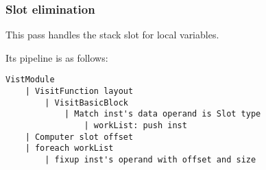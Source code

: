 \subsubsection{Slot elimination}

This pass handles the stack slot for local variables.

Its pipeline is as follows:
\begin{lstlisting}[language={}]
VistModule
    | VisitFunction layout
        | VisitBasicBlock
            | Match inst's data operand is Slot type
                | workList: push inst 
    | Computer slot offset
    | foreach workList
        | fixup inst's operand with offset and size
\end{lstlisting}